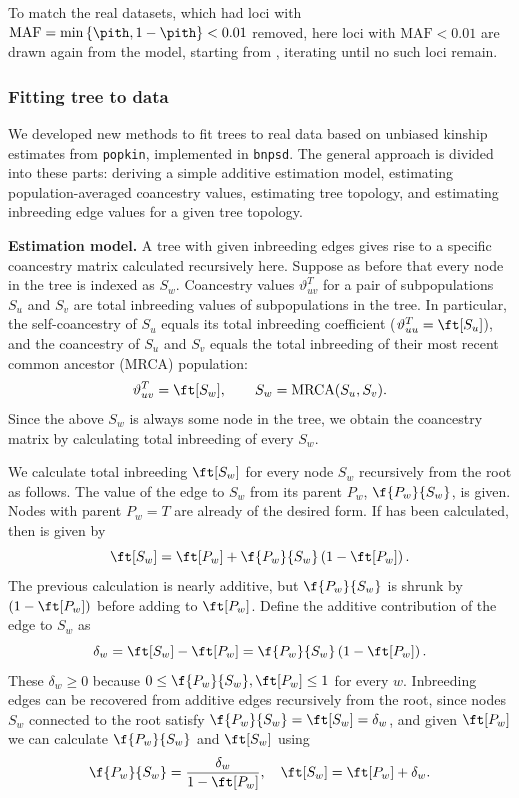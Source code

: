 \documentclass[11pt]{article}
\begin{document}
To match the real datasets, which had loci with $\text{MAF} = \min \left\{ \pith, 1 - \pith \right\} < 0.01$ removed, here loci with $\text{MAF} < 0.01$ are drawn again from the model, starting from \pit, iterating until no such loci remain.

\subsubsection{Fitting tree to data}

We developed new methods to fit trees to real data based on unbiased kinship estimates from \texttt{popkin}, implemented in \texttt{bnpsd}.
The general approach is divided into these parts:
deriving a simple additive estimation model,
estimating population-averaged coancestry values,
estimating tree topology, and
estimating inbreeding edge values for a given tree topology.

\textbf{Estimation model.}
A tree with given inbreeding edges gives rise to a specific coancestry matrix calculated recursively here.
Suppose as before that every node in the tree is indexed as $S_w$.
Coancestry values $\vartheta_{uv}^T$ for a pair of subpopulations $S_u$ and $S_v$ are total inbreeding values of subpopulations in the tree.
In particular, the self-coancestry of $S_u$ equals its total inbreeding coefficient ($\vartheta_{uu}^T = \ft[S_u]$), and the coancestry of $S_u$ and $S_v$ equals the total inbreeding of their most recent common ancestor (MRCA) population:
$$
\vartheta_{uv}^T
=
\ft[ S_w ]
,
\quad\quad
S_w = \text{MRCA}( S_u, S_v )
.
$$
Since the above $S_w$ is always some node in the tree, we obtain the coancestry matrix by calculating total inbreeding of every $S_w$.

We calculate total inbreeding $\ft[S_w]$ for every node $S_w$ recursively from the root as follows.
The value of the edge to $S_w$ from its parent $P_w$, $\f{P_w}{S_w}$, is given.
Nodes with parent $P_w = T$ are already of the desired form.
If \ft[P_w] has been calculated, then \ft[S_w] is given by \citep{ochoa_fst1}
$$
\ft[S_w] = \ft[P_w] + \f{P_w}{S_w} \left( 1 - \ft[P_w] \right).
$$
The previous calculation is nearly additive, but $\f{P_w}{S_w}$ is shrunk by $\left( 1 - \ft[P_w] \right)$ before adding to $\ft[P_w]$.
Define the additive contribution of the edge to $S_w$ as
$$
\delta_w = \ft[S_w] - \ft[P_w] = \f{P_w}{S_w} \left( 1 - \ft[P_w] \right).
$$
These $\delta_w \ge 0$ because $0 \le \f{P_w}{S_w}, \ft[P_w] \le 1$ for every $w$.
Inbreeding edges can be recovered from additive edges recursively from the root, since nodes $S_w$ connected to the root satisfy
$\f{P_w}{S_w} = \ft[S_w] = \delta_w$,
and given $\ft[P_w]$ we can calculate $\f{P_w}{S_w}$ and $\ft[S_w]$ using
\begin{equation*}
  \f{P_w}{S_w}
  =
  \frac{ \delta_w }{ 1 - \ft[P_w] },
  \quad
  \ft[S_w]
  =
  \ft[P_w] + \delta_w
  .
\end{equation*}
\end{document}
